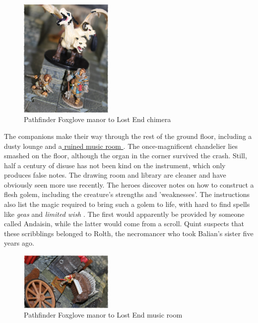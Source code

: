 \begin{figure}[h]
	\centering
	\includegraphics[width=0.4\textwidth]{images/Pathfinder-Foxglove-manor-to-Lost-End-chimera-513923128_mod.jpg}
	\caption{Pathfinder Foxglove manor to Lost End chimera}
	\label{fig:Pathfinder-Foxglove-manor-to-Lost-End-chimera-513923128}
\end{figure}

The companions make their way through the rest of the ground floor, including a dusty lounge and a\hyperref[fig:Pathfinder-Foxglove-manor-to-Lost-End-music-room-513922417]{ ruined music room } . The once-magnificent chandelier lies smashed on the floor, although the organ in the corner survived the crash. Still, half a century of disuse has not been kind on the instrument, which only produces false notes. The drawing room and library are cleaner and have obviously seen more use recently. The heroes discover notes on how to construct a flesh golem, including the creature's strengths and 'weaknesses'. The instructions also list the magic required to bring such a golem to life, with hard to find spells like  {\itshape geas} and  {\itshape limited wish} . The first would apparently be provided by someone called Andaisin, while the latter would come from a scroll. Quint suspects that these scribblings belonged to Rolth, the necromancer who took Balian's sister five years ago. \\

\begin{figure}[h]
	\centering
	\includegraphics[width=0.4\textwidth]{images/Pathfinder-Foxglove-manor-to-Lost-End-music-room-513922417_mod.jpg}
	\caption{Pathfinder Foxglove manor to Lost End music room}
	\label{fig:Pathfinder-Foxglove-manor-to-Lost-End-music-room-513922417}
\end{figure}

